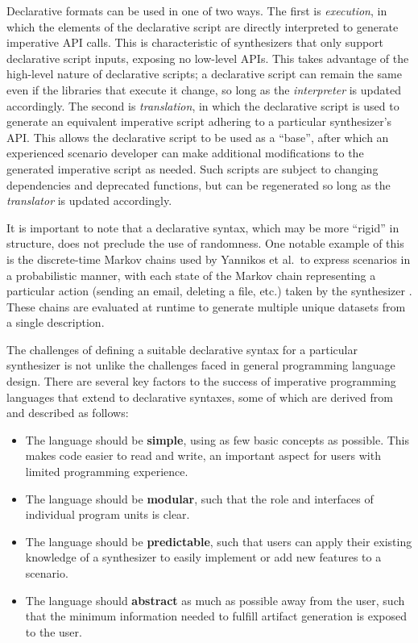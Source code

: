 \documentclass[letterpaper,12pt]{report}
\def\tightlist{}
\begin{document}
Declarative formats can be used in one of two ways. The first is
\emph{execution}, in which the elements of the declarative script are
directly interpreted to generate imperative API calls. This is
characteristic of synthesizers that only support declarative script
inputs, exposing no low-level APIs. This takes advantage of the
high-level nature of declarative scripts; a declarative script can
remain the same even if the libraries that execute it change, so long as
the \emph{interpreter} is updated accordingly. The second is
\emph{translation}, in which the declarative script is used to generate
an equivalent imperative script adhering to a particular synthesizer's
API. This allows the declarative script to be used as a ``base'', after
which an experienced scenario developer can make additional
modifications to the generated imperative script as needed. Such scripts
are subject to changing dependencies and deprecated functions, but can
be regenerated so long as the \emph{translator} is updated accordingly.

It is important to note that a declarative syntax, which may be more
``rigid'' in structure, does not preclude the use of randomness. One
notable example of this is the discrete-time Markov chains used by
Yannikos et al.~to express scenarios in a probabilistic manner, with
each state of the Markov chain representing a particular action (sending
an email, deleting a file, etc.) taken by the synthesizer
\cite{yannikosDataCorporaDigital2014}. These chains are evaluated at
runtime to generate multiple unique datasets from a single description.

The challenges of defining a suitable declarative syntax for a
particular synthesizer is not unlike the challenges faced in general
programming language design. There are several key factors to the
success of imperative programming languages that extend to declarative
syntaxes, some of which are derived from \cite{finkel1996advanced}
and described as follows:

\begin{itemize}
\tightlist
\item
  The language should be \textbf{simple}, using as few basic concepts as
  possible. This makes code easier to read and write, an important
  aspect for users with limited programming experience.\\
\item
  The language should be \textbf{modular}, such that the role and
  interfaces of individual program units is clear.
\item
  The language should be \textbf{predictable}, such that users can apply
  their existing knowledge of a synthesizer to easily implement or add
  new features to a scenario.\\
\item
  The language should \textbf{abstract} as much as possible away from
  the user, such that the minimum information needed to fulfill artifact
  generation is exposed to the user.
\end{itemize}
\end{document}

